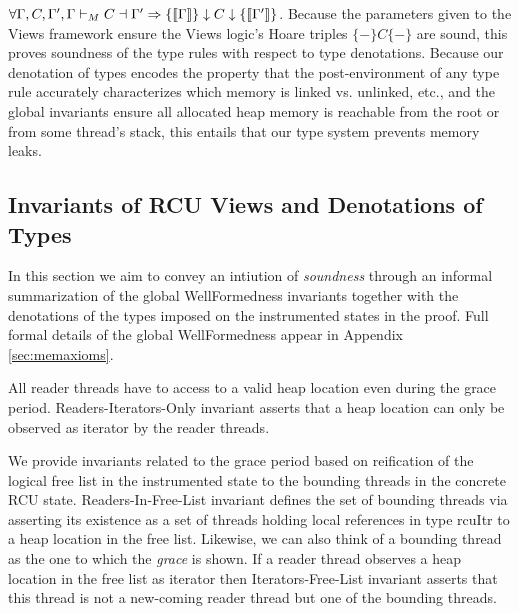 $
    \forall \Gamma,C,\Gamma', \Gamma\vdash_M C \dashv \Gamma' \Rightarrow \{\llbracket\Gamma\rrbracket\}\downarrow C\downarrow\{\llbracket\Gamma'\rrbracket\}
$.
Because the parameters given to the Views framework ensure the Views logic's Hoare triples $\{-\}C\{-\}$ are sound, this proves soundness of the type rules with respect to type denotations.
Because our denotation of types encodes the property that the post-environment of any type rule accurately characterizes which memory is linked vs. unlinked, etc., and the global invariants ensure all allocated heap memory is reachable from the root or from some thread's stack, this entails that our type system prevents memory leaks.

\subsection{Invariants of RCU Views and Denotations of Types}
\label{sec:lemmas}
In this section we aim to convey an intiution of \textit{soundness} through an informal summarization of the global \textsf{WellFormed}ness invariants together with the denotations of the types imposed on the instrumented states in the proof. Full formal details of the global \textsf{WellFormed}ness appear in Appendix \ref{sec:memaxioms}.

 All reader threads have to access to a valid heap location even during the grace period. \textsf{Readers-Iterators-Only} invariant asserts that a heap location can only be observed as \textsf{iterator} by the reader threads.

 We provide invariants related to the grace period based on reification of the logical free list in the instrumented state to the bounding threads in the concrete RCU state. \textsf{Readers-In-Free-List} invariant defines the set of bounding threads via asserting its existence as a set of threads holding local references in type \textsf{rcuItr} to a heap location in the free list. Likewise, we can also think of a bounding thread as the one to which the \textit{grace} is shown. If a reader thread observes a heap location in the free list as \textsf{iterator} then \textsf{Iterators-Free-List} invariant asserts that this thread is not a new-coming reader thread but one of the bounding threads.

